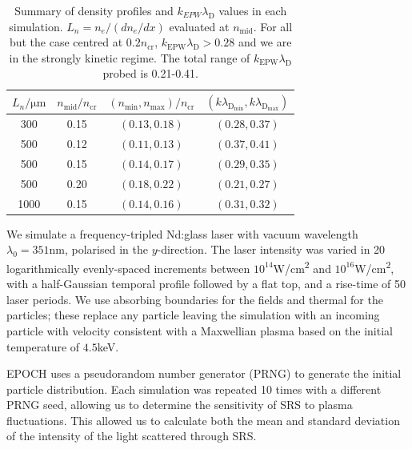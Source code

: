 \begin{table}[ht]
    \begin{center}
    \begin{tabular}{|c|c|c|c|}
    \hline 
    $L_n/\si{\micro \metre}$  & $n_\mathrm{mid}/n_\mathrm{cr}$ & $(n_\mathrm{min},n_\mathrm{max})/n_\mathrm{cr}$ &$(k\lambda_\mathrm{D_{min}},k\lambda_\mathrm{D_{max}})$\\
    \hline \hline
    300& 0.15  & $(0.13,0.18)$ & $(0.28,0.37)$\\
    500 & 0.12 &$(0.11,0.13)$ & $(0.37,0.41)$\\
    500 & 0.15 & $(0.14,0.17)$& $(0.29,0.35)$ \\
    500 & 0.20 & $(0.18,0.22)$& $(0.21,0.27)$\\
    1000 & 0.15 & $(0.14,0.16)$ & $(0.31,0.32)$ \\
    \hline
    \end{tabular}
    \end{center}
        \caption{\label{tab:densities}
        Summary of density profiles and $k_{EPW}\lambda_\mathrm{D}$ values in each simulation. $L_n=n_e/(dn_e/dx)$ evaluated at $n_\mathrm{mid}$. For all but the case centred at $0.2n_\mathrm{cr}$, $k_\mathrm{EPW}\lambda_\mathrm{D} > 0.28$ and we are in the strongly kinetic regime. The total range of $k_\mathrm{EPW}\lambda_\mathrm{D}$ probed is 0.21-0.41.
        }
\end{table}


We simulate a frequency-tripled Nd:glass laser with vacuum wavelength $\lambda_0 = 351\si{\nano\metre}$, polarised in the $y$-direction. The laser intensity was varied in 20 logarithmically evenly-spaced increments between $10^{14}$\si{W/\centi\metre^2} and $10^{16}$\si{W/\centi\metre^2}, with a half-Gaussian temporal profile followed by a flat top, and a rise-time of 50 laser periods.
We use absorbing boundaries for the fields and thermal for the particles; these replace any particle leaving the
simulation with an incoming particle with velocity consistent with a Maxwellian plasma based on the initial temperature of $4.5$\si{keV}.


EPOCH uses a pseudorandom number generator (PRNG) to generate the initial particle distribution.
Each simulation was repeated 10 times with a different PRNG seed, allowing us to determine the sensitivity of
SRS to plasma fluctuations.
This allowed us to calculate both the mean and standard deviation of the intensity of the light scattered through SRS.


